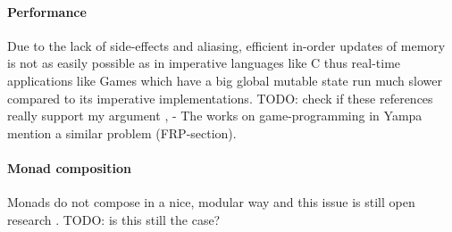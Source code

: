 \paragraph{Performance}
Due to the lack of side-effects and aliasing, efficient in-order updates of memory is not as easily possible as in imperative languages like C thus real-time applications like Games which have a big global mutable state run much slower compared to its imperative implementations.
TODO: check if these references really support my argument \cite{mun_hon_functional_2005}, \cite{meisinger_game-engine-architektur_2010} - The works on game-programming in Yampa mention a similar problem (FRP-section).

\paragraph{Monad composition}
Monads do not compose in a nice, modular way and this issue is still open research \cite{hudak_history_2007}. TODO: is this still the case?




